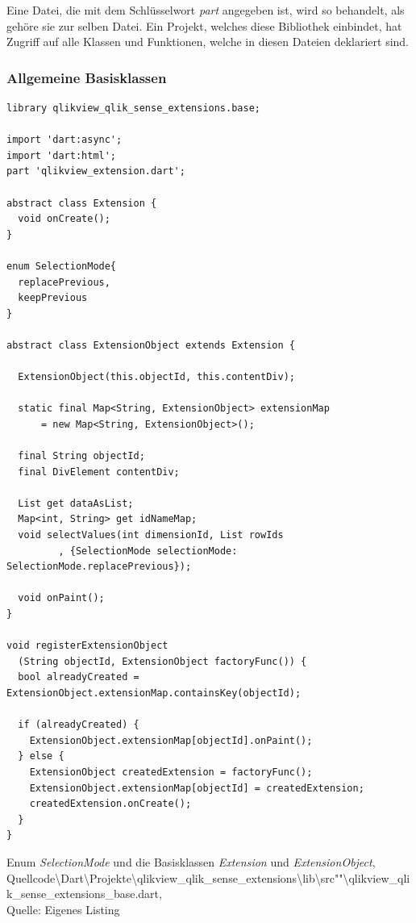 Eine Datei, die mit dem Schlüssel\-wort \textit{part} angegeben ist, wird so behandelt, als gehöre sie zur selben Datei. Ein Projekt, welches diese Bibliothek einbindet, hat Zugriff auf alle Klassen und Funktionen, welche in diesen Dateien deklariert sind.

\subsubsection{Allgemeine Basisklassen}


\begin{listing}[htbp]
\begin{verbatim}
library qlikview_qlik_sense_extensions.base;

import 'dart:async';
import 'dart:html';
part 'qlikview_extension.dart'; 

abstract class Extension {
  void onCreate();
}

enum SelectionMode{
  replacePrevious,
  keepPrevious
}

abstract class ExtensionObject extends Extension {

  ExtensionObject(this.objectId, this.contentDiv);

  static final Map<String, ExtensionObject> extensionMap 
	  = new Map<String, ExtensionObject>();

  final String objectId;
  final DivElement contentDiv;

  List get dataAsList;
  Map<int, String> get idNameMap;
  void selectValues(int dimensionId, List rowIds
         , {SelectionMode selectionMode: SelectionMode.replacePrevious});
  
  void onPaint();
}

void registerExtensionObject
  (String objectId, ExtensionObject factoryFunc()) {
  bool alreadyCreated = ExtensionObject.extensionMap.containsKey(objectId);

  if (alreadyCreated) {
    ExtensionObject.extensionMap[objectId].onPaint();
  } else {
    ExtensionObject createdExtension = factoryFunc();
    ExtensionObject.extensionMap[objectId] = createdExtension;
    createdExtension.onCreate();
  }
}
\end{verbatim}
\caption[Enum \textit{SelectionMode} und die Basisklassen \textit{Extension} und \textit{ExtensionObject}]{Enum \textit{SelectionMode} und die Basisklassen \textit{Extension} und \textit{ExtensionObject}, \\Quellcode\textbackslash{}Dart\textbackslash{}Projekte\textbackslash{}qlikview\_qlik\_sense\_extensions\textbackslash{}lib\textbackslash{}src""\textbackslash{}qlikview\_qlik\_sense\_extensions\_base.dart, \\Quelle: Eigenes Listing}
\label{lst:QlikViewQlikSenseExtensionsBaseDart}
\end{listing}

